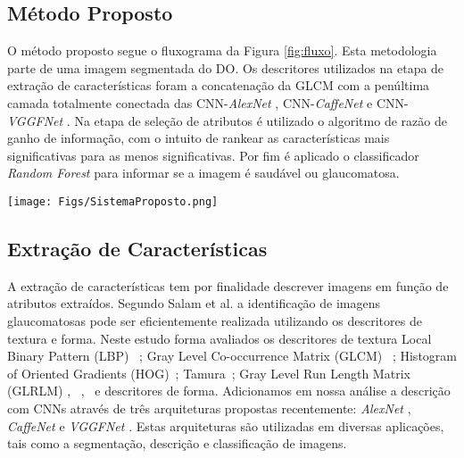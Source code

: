 \documentclass[fleqn,10pt]{SelfArx} %
\begin{document}
\subsection{Método Proposto}
O método proposto segue o fluxograma da Figura \ref{fig:fluxo}. Esta metodologia parte de uma imagem segmentada do DO. Os descritores utilizados na etapa de extração de características foram a concatenação da GLCM com a penúltima camada totalmente conectada das CNN-\textit{AlexNet} \cite{Krizhevsky:2012}, CNN-\textit{CaffeNet} \cite{Jia:2014} e CNN-\textit{VGGFNet} \cite{Chatfield14}. Na etapa de seleção de atributos é utilizado o algoritmo de razão de ganho de informação, com o intuito de rankear as características mais significativas para as menos significativas. Por fim é aplicado o classificador \textit{Random Forest} para informar se a imagem é saudável ou glaucomatosa.

\begin{figure*}[!h]
	\centering
	\texttt{[image: Figs/SistemaProposto.png]}
	\caption{Fluxograma da metodologia proposta para diagnóstico automático do glaucoma.}
	\label{fig:fluxo}
\end{figure*}



\subsection{Extração de Características}

A extração de características tem por finalidade descrever imagens em função de atributos extraídos. Segundo Salam et al. \cite{salam2016automated} a identificação de imagens glaucomatosas pode ser eficientemente realizada utilizando os descritores de textura e forma. Neste estudo forma avaliados os descritores de textura Local Binary Pattern (LBP) ~\cite{ojala1997unsupervised}; Gray Level Co-occurrence Matrix (GLCM) ~\cite{haralick1973textural}; Histogram of Oriented Gradients (HOG)~\cite{dalal2005histograms};  Tamura~\cite{tamura1978textural}; Gray Level Run Length Matrix (GLRLM) \cite{galloway1975texture}, ~\cite{chu1990use},~\cite{dasarathy1991image} e descritores de forma.  Adicionamos em nossa análise a descrição com CNNs através de três arquiteturas propostas recentemente: \textit{AlexNet} \cite{Krizhevsky:2012}, \textit{CaffeNet} \cite{Jia:2014} e \textit{VGGFNet} \cite{Chatfield14}. Estas arquiteturas são utilizadas em diversas aplicações, tais como a segmentação, descrição e classificação de imagens.
\end{document}
